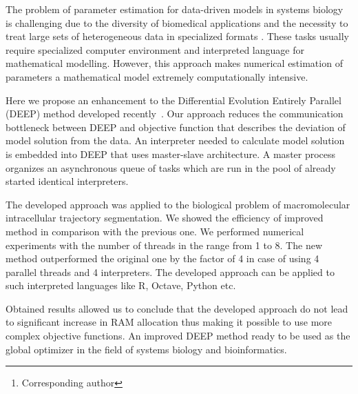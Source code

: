 \documentclass[12pt, a4paper]{article} %
\begin{document}

\renewcommand{\abstractname}{\large \textbf{\uppercase{
    Deep: optimizer with embedded interpreter\\
}}}
\begin{abstract}
    \normalsize %
    \bigskip %
    \noindent A.~V.~Svichkarev\footnote[*]{Corresponding author}, K.~N.~Kozlov \\
    \noindent
    System biology and bioinformatics lab, IAMM,
    Peter the Great St.Petersburg Polytechnic University,
St.Petersburg, Russia \\
    \noindent e-mail: tolik0393@bionet.nsc.ru \\
\end{abstract}

The problem of parameter estimation
for data-driven models in systems biology
is challenging due to the diversity
of biomedical applications and
the necessity to treat large sets of
heterogeneous data in specialized formats \cite{mendes1998non}.
These tasks usually require
specialized computer environment
and interpreted language for
mathematical modelling.
However, this approach makes
numerical estimation of parameters
a mathematical model
extremely computationally intensive.

Here we propose
an enhancement to the
Differential Evolution Entirely Parallel (DEEP) method
developed recently~\cite{Kozlov11}.
Our approach reduces the
communication bottleneck
between DEEP and objective function
that describes the deviation
of model solution
from the data.
An interpreter needed to
calculate model solution
is embedded into
DEEP that uses
master-slave architecture.
A master process
organizes an asynchronous queue
of tasks which are run
in the pool of
already started identical interpreters.

The developed approach was
applied to the biological problem
of macromolecular intracellular
trajectory segmentation.
We showed the efficiency of improved method
in comparison with the previous one.
We performed numerical experiments
with the number of threads
in the range from 1 to 8.
The new method outperformed
the original one by the
factor of 4
in case of using 4
parallel threads and 4
interpreters.
The developed approach can be applied to
such interpreted languages like
R, Octave, Python etc.

Obtained results allowed us
to conclude that
the developed approach
do not lead to significant increase
in RAM allocation thus making
it possible to use
more complex objective functions.
An improved DEEP method ready
to be used as the global optimizer
in the field of systems biology
and bioinformatics.

\vfill %
\end{document}
